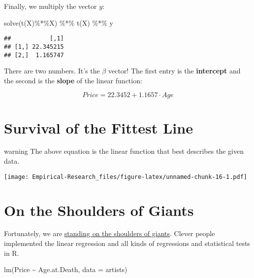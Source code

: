 \documentclass[
]{book}
\newenvironment{Shaded}{\begin{snugshade}}{\end{snugshade}}
\newcommand{\AttributeTok}[1]{\textcolor[rgb]{0.77,0.63,0.00}{#1}}
\newcommand{\FunctionTok}[1]{\textcolor[rgb]{0.00,0.00,0.00}{#1}}
\newcommand{\NormalTok}[1]{#1}
\newcommand{\SpecialCharTok}[1]{\textcolor[rgb]{0.00,0.00,0.00}{#1}}
\begin{document}
Finally, we multiply the vector \(y\):

\begin{Shaded}
\begin{Highlighting}[]
\FunctionTok{solve}\NormalTok{(}\FunctionTok{t}\NormalTok{(X)}\SpecialCharTok{\%*\%}\NormalTok{X) }\SpecialCharTok{\%*\%} \FunctionTok{t}\NormalTok{(X) }\SpecialCharTok{\%*\%}\NormalTok{ y}
\end{Highlighting}
\end{Shaded}

\begin{verbatim}
##           [,1]
## [1,] 22.345215
## [2,]  1.165747
\end{verbatim}

There are two numbers. It's the \(\beta\) vector! The first entry is the \textbf{intercept} and the second is the \textbf{slope} of the linear function:

\[Price = 22.3452 + 1.1657 \cdot Age\]

\hypertarget{survival-of-the-fittest-line}{%
\section{Survival of the Fittest Line}\label{survival-of-the-fittest-line}}

\begin{infobox}warning
The above equation is the linear function that best describes the given data.

\end{infobox}

\texttt{[image: Empirical-Research\_files/figure-latex/unnamed-chunk-16-1.pdf]}

\hypertarget{on-the-shoulders-of-giants}{%
\section{On the Shoulders of Giants}\label{on-the-shoulders-of-giants}}

Fortunately, we are \href{https://en.wikipedia.org/wiki/Standing_on_the_shoulders_of_giants}{standing on the shoulders of giants}. Clever people implemented the linear regression and all kinds of regressions and statistical tests in R.

\begin{Shaded}
\begin{Highlighting}[]
\FunctionTok{lm}\NormalTok{(Price }\SpecialCharTok{\textasciitilde{}}\NormalTok{ Age.at.Death, }\AttributeTok{data =}\NormalTok{ artists)}
\end{Highlighting}
\end{Shaded}
\end{document}
